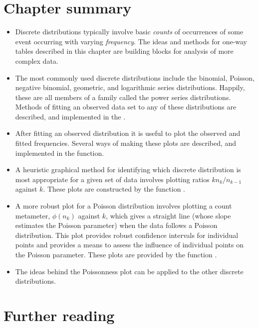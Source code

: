 \documentclass[11pt]{book}
\begin{document}
\section{Chapter summary}\label{sec:ch03-summary}

\begin{itemize}
\item Discrete distributions typically involve basic \emph{counts} of occurrences
of some event occurring with varying \emph{frequency}. The ideas and methods
for one-way tables described in this chapter are building blocks for analysis
of more complex data.

\item The most commonly used discrete distributions include the binomial,
Poisson, negative binomial, geometric, and logarithmic series distributions.
Happily, these are all members of a family called the
power series distributions.
Methods of fitting an observed data set to any of these distributions are
described, and implemented in the .

\item After fitting an observed distribution it is useful to plot the observed
and fitted frequencies.
Several ways of making these plots are described, and implemented in the
 function.

\item A heuristic graphical method for identifying which discrete distribution is most
appropriate for a given set of data involves plotting ratios
$k n_k / n_{k-1}$ against $k$.
These plots are constructed by the function .

\item A more robust plot for a Poisson distribution involves plotting
a count metameter, $\phi ( n_k ) $ against $k$, which
gives a straight line (whose slope estimates the Poisson parameter)
when the data follows a Poisson distribution.
This plot provides robust confidence intervals for individual points
and provides a means to assess the influence of individual points
on the Poisson parameter.
These plots are provided by the function .

\item The ideas behind the Poissonness plot can be applied to the other
discrete distributions.
\end{itemize}


\section{Further reading}\label{sec:ch03-reading}
\end{document}

